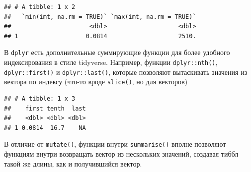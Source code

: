 \documentclass[]{book}
\newenvironment{Shaded}{\begin{snugshade}}{\end{snugshade}}
\newcommand{\KeywordTok}[1]{\textcolor[rgb]{0.13,0.29,0.53}{\textbf{#1}}}
\newcommand{\DataTypeTok}[1]{\textcolor[rgb]{0.13,0.29,0.53}{#1}}
\newcommand{\DecValTok}[1]{\textcolor[rgb]{0.00,0.00,0.81}{#1}}
\newcommand{\StringTok}[1]{\textcolor[rgb]{0.31,0.60,0.02}{#1}}
\newcommand{\CommentTok}[1]{\textcolor[rgb]{0.56,0.35,0.01}{\textit{#1}}}
\newcommand{\OtherTok}[1]{\textcolor[rgb]{0.56,0.35,0.01}{#1}}
\newcommand{\OperatorTok}[1]{\textcolor[rgb]{0.81,0.36,0.00}{\textbf{#1}}}
\newcommand{\NormalTok}[1]{#1}
\begin{document}
\begin{verbatim}
## # A tibble: 1 x 2
##   `min(imt, na.rm = TRUE)` `max(imt, na.rm = TRUE)`
##                      <dbl>                    <dbl>
## 1                   0.0814                    2510.
\end{verbatim}

В \texttt{dplyr} есть дополнительные суммирующие функции для более
удобного индексирования в стиле tidyverse. Например, функции
\texttt{dplyr::nth()}, \texttt{dplyr::first()} и \texttt{dplyr::last()},
которые позволяют вытаскивать значения из вектора по индексу (что-то
вроде \texttt{slice()}, но для векторов)

\begin{Shaded}
\end{Shaded}

\begin{verbatim}
## # A tibble: 1 x 3
##    first tenth  last
##    <dbl> <dbl> <dbl>
## 1 0.0814  16.7    NA
\end{verbatim}

В отличие от \texttt{mutate()}, функции внутри \texttt{summarise()}
вполне позволяют функциям внутри возвращать вектор из нескольких
значений, создавая тиббл такой же длины, как и получившийся вектор.

\begin{Shaded}
\end{Shaded}
\end{document}
